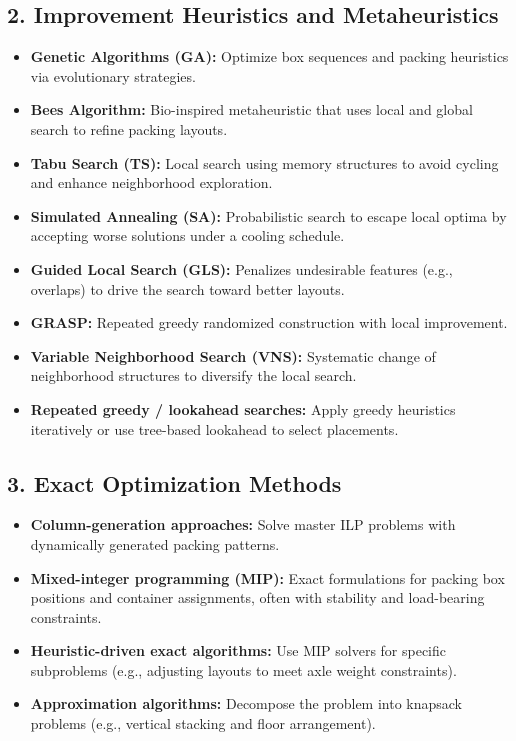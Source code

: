 \subsection*{2. Improvement Heuristics and Metaheuristics}
\begin{itemize}
    \item \textbf{Genetic Algorithms (GA):} Optimize box sequences and packing heuristics via evolutionary strategies.
    \item \textbf{Bees Algorithm:} Bio-inspired metaheuristic that uses local and global search to refine packing layouts.
    \item \textbf{Tabu Search (TS):} Local search using memory structures to avoid cycling and enhance neighborhood exploration.
    \item \textbf{Simulated Annealing (SA):} Probabilistic search to escape local optima by accepting worse solutions under a cooling schedule.
    \item \textbf{Guided Local Search (GLS):} Penalizes undesirable features (e.g., overlaps) to drive the search toward better layouts.
    \item \textbf{GRASP:} Repeated greedy randomized construction with local improvement.
    \item \textbf{Variable Neighborhood Search (VNS):} Systematic change of neighborhood structures to diversify the local search.
    \item \textbf{Repeated greedy / lookahead searches:} Apply greedy heuristics iteratively or use tree-based lookahead to select placements.
\end{itemize}

\subsection*{3. Exact Optimization Methods}
\begin{itemize}
    \item \textbf{Column-generation approaches:} Solve master ILP problems with dynamically generated packing patterns.
    \item \textbf{Mixed-integer programming (MIP):} Exact formulations for packing box positions and container assignments, often with stability and load-bearing constraints.
    \item \textbf{Heuristic-driven exact algorithms:} Use MIP solvers for specific subproblems (e.g., adjusting layouts to meet axle weight constraints).
    \item \textbf{Approximation algorithms:} Decompose the problem into knapsack problems (e.g., vertical stacking and floor arrangement).
\end{itemize}

